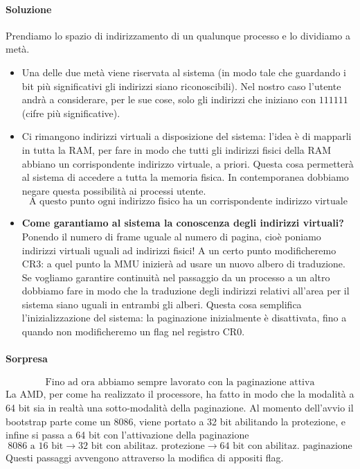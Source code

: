 \paragraph{Soluzione} Prendiamo lo spazio di indirizzamento di un qualunque processo e lo dividiamo a metà. 
\begin{itemize}
	\item Una delle due metà viene riservata al sistema (in modo tale che guardando i bit più significativi gli indirizzi siano riconoscibili). Nel nostro caso l'utente andrà a considerare, per le sue cose, solo gli indirizzi che iniziano con $111111$ (cifre più significative).
	\item Ci rimangono indirizzi virtuali a disposizione del sistema: l'idea è di mapparli in tutta la RAM, per fare in modo che tutti gli indirizzi fisici della RAM abbiano un corrispondente indirizzo virtuale, a priori. Questa cosa permetterà al sistema di accedere a tutta la memoria fisica. In contemporanea dobbiamo negare questa possibilità ai processi utente.
	\[\boxed{\text{A questo punto ogni indirizzo fisico ha un corrispondente indirizzo virtuale}}\]
	\item \textbf{Come garantiamo al sistema la conoscenza degli indirizzi virtuali?} Ponendo il numero di frame uguale al numero di pagina, cioè poniamo indirizzi virtuali uguali ad indirizzi fisici! A un certo punto modificheremo CR3: a quel punto la MMU inizierà ad usare un nuovo albero di traduzione. Se vogliamo garantire continuità nel passaggio da un processo a un altro dobbiamo fare in modo che la traduzione degli indirizzi relativi all'area per il sistema siano uguali in entrambi gli alberi. Questa cosa semplifica l'inizializzazione del sistema: la paginazione inizialmente è disattivata, fino a quando non modificheremo un flag nel registro CR0. 
\end{itemize} 

\paragraph{Sorpresa} 
\[\boxed{\text{Fino ad ora abbiamo sempre lavorato con la paginazione attiva}}\]
\noindent La AMD, per come ha realizzato il processore, ha fatto in modo che la modalità  a 64 bit sia in realtà una sotto-modalità della paginazione. Al momento dell'avvio il bootstrap parte come un 8086, viene portato a 32 bit abilitando la protezione, e infine si passa a 64 bit con l'attivazione della paginazione
\[\text{8086 a 16 bit} \longrightarrow \text{32 bit con abilitaz. protezione} \longrightarrow \text{64 bit con abilitaz. paginazione}\]
Questi passaggi avvengono attraverso la modifica di appositi flag.
